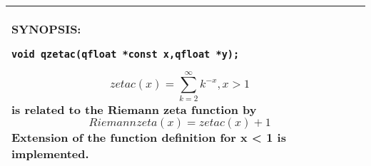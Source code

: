 \documentclass[10pt,a4paper,x11names]{memoir} %
\begin{document}
\begin{longtable}{|p{1.5cm}|p{11.5cm}|}
	{\footnotesize SYNOPSIS:}\vspace{-0.2cm}
	\begin{lstlisting}[numbers=none]
		void qzetac(qfloat *const x,qfloat *y);
	\end{lstlisting}\vspace{-0.2cm}
	$$zetac(x)=\sum_{k=2}^{\infty} k^{-x}, x>1$$
	is related to the Riemann zeta function by
	$$Riemann zeta(x) = zetac(x) + 1$$
	Extension of the function definition for x < 1 is implemented.
	
	\\\hline
\end{longtable}
\printindex
\end{document}
